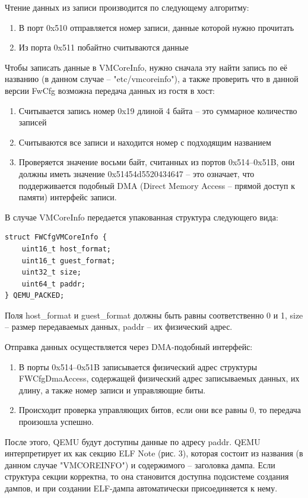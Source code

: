 \documentclass{mipt-thesis-bs}
\begin{document}
Чтение данных из записи производится по следующему алгоритму:
\begin{enumerate}
\item В порт 0x510 отправляется номер записи, данные которой нужно прочитать
\item Из порта 0x511 побайтно считываются данные
\end{enumerate}

Чтобы записать данные в VMCoreInfo, нужно сначала эту найти запись по её названию (в данном случае -- "etc/vmcoreinfo"), а также проверить что в данной версии FwCfg возможна передача данных из гостя в хост:

\begin{enumerate}
\item Считывается запись номер 0x19 длиной 4 байта -- это суммарное количество записей
\item Считываются все записи и находится номер с подходящим названием
\item Проверяется значение восьми байт, считанных из портов 0x514--0x51B, они должны иметь значение 0x51454d5520434647 -- это означает, что поддерживается подобный DMA (Direct Memory Access -- прямой доступ к памяти) интерфейс записи.
\end{enumerate}

В случае VMCoreInfo передается упакованная структура следующего вида:

\begin{verbatim}
struct FWCfgVMCoreInfo {
    uint16_t host_format;
    uint16_t guest_format;
    uint32_t size;
    uint64_t paddr;
} QEMU_PACKED;
\end{verbatim}

Поля host{\_}format и guest{\_}format должны быть равны соответственно 0 и 1, size -- размер передаваемых данных, paddr -- их физический адрес.

Отправка данных осуществляется через DMA-подобный интерфейс:

\begin{enumerate}
\item В порты 0x514--0x51B записывается физический адрес структуры FWCfgDmaAccess, содержащей физический адрес записываемых данных, их длину, а также номер записи и управляющие биты.
\item Происходит проверка управляющих битов, если они все равны 0, то передача произошла успешно.
\end{enumerate}

После этого, QEMU будут доступны данные по адресу paddr. QEMU интерпретирует их как секцию ELF Note (рис. 3), которая состоит из названия (в данном случае "VMCOREINFO") и содержимого -- заголовка дампа\cite{elfspec}. Если структура секции корректна, то она становится доступна подсистеме создания дампов, и при создании ELF-дампа автоматически присоединяется к нему.
\end{document}
